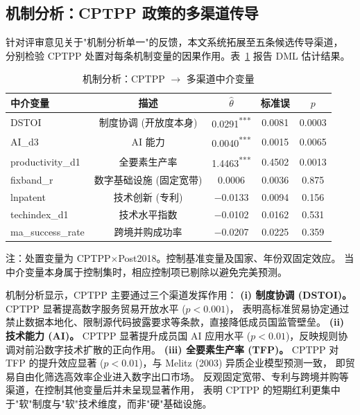 \documentclass[11pt,a4paper]{article}
\begin{document}
\subsection{机制分析：CPTPP 政策的多渠道传导}

针对评审意见关于"机制分析单一"的反馈，本文系统拓展至五条候选传导渠道，
分别检验 CPTPP 处置对每条机制变量的因果作用。表~\ref{tab:mech} 报告 DML 估计结果。

\begin{table}[H]
\centering\small
\caption{机制分析：CPTPP $\to$ 多渠道中介变量}\label{tab:mech}
\begin{threeparttable}
\begin{tabular}{lcccc}
\toprule
中介变量 & 描述 & $\hat\theta$ & 标准误 & $p$ \\
\midrule
DSTOI               & 制度协调 (开放度本身)     & 0.0291\textsuperscript{***} & 0.0081 & 0.0003 \\
AI\_d3              & AI 能力                  & 0.0040\textsuperscript{***} & 0.0015 & 0.0065 \\
productivity\_d1    & 全要素生产率              & 1.4463\textsuperscript{***} & 0.4502 & 0.0013 \\
fixband\_r          & 数字基础设施 (固定宽带)   & 0.0006 & 0.0036 & 0.875 \\
lnpatent            & 技术创新 (专利)           & $-$0.0133 & 0.0094 & 0.156 \\
techindex\_d1       & 技术水平指数              & $-$0.0102 & 0.0162 & 0.531 \\
ma\_success\_rate   & 跨境并购成功率            & $-$0.0207 & 0.0225 & 0.359 \\
\bottomrule
\end{tabular}
\begin{tablenotes}\footnotesize
\item 注：处置变量为 CPTPP$\times$Post2018。控制基准变量及国家、年份双固定效应。
当中介变量本身属于控制集时，相应控制项已剔除以避免完美预测。
\end{tablenotes}
\end{threeparttable}
\end{table}

机制分析显示，CPTPP 主要通过三个渠道发挥作用：
\textbf{(i) 制度协调 (DSTOI)。} CPTPP 显著提高数字服务贸易开放水平 ($p<0.001$)，
表明高标准贸易协定通过禁止数据本地化、限制源代码披露要求等条款，直接降低成员国监管壁垒。
\textbf{(ii) 技术能力 (AI)。} CPTPP 显著提升成员国 AI 应用水平 ($p<0.01$)，反映规则协调对前沿数字技术扩散的正向作用。
\textbf{(iii) 全要素生产率 (TFP)。} CPTPP 对 TFP 的提升效应显著 ($p<0.01$)，与 Melitz (2003) 异质企业模型预测一致，
即贸易自由化筛选高效率企业进入数字出口市场。
反观固定宽带、专利与跨境并购等渠道，在控制其他变量后并未呈现显著作用，
表明 CPTPP 的短期红利更集中于"软"制度与"软"技术维度，而非"硬"基础设施。
\end{document}
